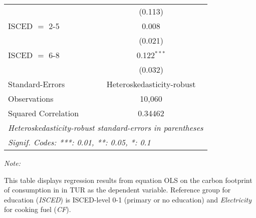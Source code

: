 \begin{table}[htbp!]
\begin{adjustbox}{width = 1\textwidth, max height = 0.95\textheight, center}
\begin{threeparttable}[b]
\begin{tabular}{lc}
                                & (0.113)\\   
            ISCED $=$ 2-5       & 0.008\\   
                                & (0.021)\\   
            ISCED $=$ 6-8       & 0.122$^{***}$\\   
                                & (0.032)\\   
            \midrule 
            Standard-Errors     & Heteroskedasticity-robust \\   
            Observations        & 10,060\\  
            Squared Correlation & 0.34462\\  
            \midrule \midrule
            \multicolumn{2}{l}{\emph{Heteroskedasticity-robust standard-errors in parentheses}}\\
            \multicolumn{2}{l}{\emph{Signif. Codes: ***: 0.01, **: 0.05, *: 0.1}}\\
         \end{tabular}
         
         \begin{tablenotes}\item \medskip \textit{Note:}
            \item This table displays regression results from equation OLS on the carbon footprint of consumption in  in TUR as the dependent variable.  Reference group for education (\textit{ISCED}) is ISCED-level 0-1 (primary or no education) and \textit{Electricity} for cooking fuel (\textit{CF}).
         \end{tablenotes}
      \end{threeparttable}
   \end{adjustbox}
\end{table}


